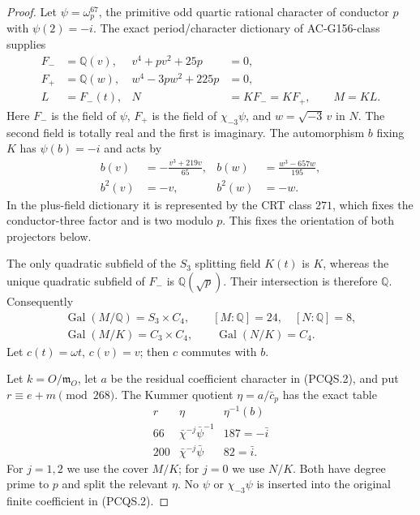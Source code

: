 \begin{proof}
Let $\psi=\omega_p^{67}$, the primitive odd quartic rational
character of conductor $p$ with $\psi(2)=-i$.
The exact period/character dictionary of AC-G156-class supplies
\[
 \begin{aligned}
 F_-&=\mathbb Q(v),&v^4+pv^2+25p&=0,\\
 F_+&=\mathbb Q(w),&w^4-3pw^2+225p&=0,\\
 L&=F_-(t),&N&=KF_-=KF_+,\qquad M=KL.
 \end{aligned}
 \tag{PCQS.3}
\]
Here $F_-$ is the field of $\psi$, $F_+$ is the field of
$\chi_{-3}\psi$, and $w=\sqrt{-3}\,v$ in $N$.
The second field is totally real and the first is imaginary.
The automorphism $b$ fixing $K$ has $\psi(b)=-i$ and acts by
\[
 \begin{aligned}
 b(v)&=-\frac{v^3+219v}{65},&
 b(w)&=\frac{w^3-657w}{195},\\
 b^2(v)&=-v,& b^2(w)&=-w.
 \end{aligned}
 \tag{PCQS.4}
\]
In the plus-field dictionary it is represented by the CRT class
$271$, which fixes the conductor-three factor and is two modulo $p$.
This fixes the orientation of both projectors below.

The only quadratic subfield of the $S_3$ splitting field $K(t)$
is $K$, whereas the unique quadratic subfield of $F_-$ is
$\mathbb Q(\sqrt p)$.
Their intersection is therefore $\mathbb Q$.
Consequently
\[
 \begin{gathered}
 \operatorname{Gal}(M/\mathbb Q)=S_3\times C_4,
 \qquad[M:\mathbb Q]=24,\quad[N:\mathbb Q]=8,\\
 \operatorname{Gal}(M/K)=C_3\times C_4,
 \qquad\operatorname{Gal}(N/K)=C_4.
 \end{gathered}
 \tag{PCQS.5}
\]
Let $c(t)=\omega t$, $c(v)=v$; then $c$ commutes with $b$.

Let $k=O/\mathfrak m_O$, let $a$ be the residual coefficient
character in (PCQS.2), and put $r\equiv e+m\pmod{268}$.
The Kummer quotient $\eta=a/\bar c_p$ has the exact table
\[
 \begin{array}{c|c|c}
 r&\eta&\eta^{-1}(b)\\ \hline
 66&\bar\chi^{-j}\bar\psi^{-1}&187=-\bar i\\
 200&\bar\chi^{-j}\bar\psi&82=\bar i.
 \end{array}
 \tag{PCQS.6}
\]
For $j=1,2$ we use the cover $M/K$; for $j=0$ we use $N/K$.
Both have degree prime to $p$ and split the relevant $\eta$.
No $\psi$ or $\chi_{-3}\psi$ is inserted into the original
finite coefficient in (PCQS.2).


\end{proof}
